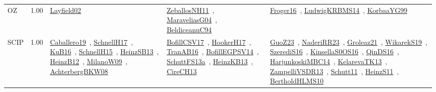 {\begin{longtable}{p{3cm}r>{\raggedright\arraybackslash}p{6cm}>{\raggedright\arraybackslash}p{6cm}>{\raggedright\arraybackslash}p{8cm}}
\index{OZ}\index{CPSystems!OZ}OZ &  1.00 & \href{../works/Layfield02.pdf}{Layfield02}~\cite{Layfield02} & \href{../works/ZeballosNH11.pdf}{ZeballosNH11}~\cite{ZeballosNH11}, \href{../works/MaraveliasG04.pdf}{MaraveliasG04}~\cite{MaraveliasG04}, \href{../works/BeldiceanuC94.pdf}{BeldiceanuC94}~\cite{BeldiceanuC94} & \href{../works/Froger16.pdf}{Froger16}~\cite{Froger16}, \href{../works/LudwigKRBMS14.pdf}{LudwigKRBMS14}~\cite{LudwigKRBMS14}, \href{../works/KorbaaYG99.pdf}{KorbaaYG99}~\cite{KorbaaYG99}\\
\index{SCIP}\index{CPSystems!SCIP}SCIP &  1.00 & \href{../works/Caballero19.pdf}{Caballero19}~\cite{Caballero19}, \href{../works/SchnellH17.pdf}{SchnellH17}~\cite{SchnellH17}, \href{../works/KuB16.pdf}{KuB16}~\cite{KuB16}, \href{../works/SchnellH15.pdf}{SchnellH15}~\cite{SchnellH15}, \href{../works/HeinzSB13.pdf}{HeinzSB13}~\cite{HeinzSB13}, \href{../works/HeinzB12.pdf}{HeinzB12}~\cite{HeinzB12}, \href{../works/MilanoW09.pdf}{MilanoW09}~\cite{MilanoW09}, \href{../works/AchterbergBKW08.pdf}{AchterbergBKW08}~\cite{AchterbergBKW08} & \href{../works/BofillCSV17.pdf}{BofillCSV17}~\cite{BofillCSV17}, \href{../works/HookerH17.pdf}{HookerH17}~\cite{HookerH17}, \href{../works/TranAB16.pdf}{TranAB16}~\cite{TranAB16}, \href{../works/BofillEGPSV14.pdf}{BofillEGPSV14}~\cite{BofillEGPSV14}, \href{../works/SchuttFS13a.pdf}{SchuttFS13a}~\cite{SchuttFS13a}, \href{../works/HeinzKB13.pdf}{HeinzKB13}~\cite{HeinzKB13}, \href{../works/CireCH13.pdf}{CireCH13}~\cite{CireCH13} & \href{../works/GuoZ23.pdf}{GuoZ23}~\cite{GuoZ23}, \href{../works/NaderiRR23.pdf}{NaderiRR23}~\cite{NaderiRR23}, \href{../works/Groleaz21.pdf}{Groleaz21}~\cite{Groleaz21}, \href{../works/WikarekS19.pdf}{WikarekS19}~\cite{WikarekS19}, \href{../works/SzerediS16.pdf}{SzerediS16}~\cite{SzerediS16}, \href{../works/KinsellaS0OS16.pdf}{KinsellaS0OS16}~\cite{KinsellaS0OS16}, \href{../works/QinDS16.pdf}{QinDS16}~\cite{QinDS16}, \href{../works/HarjunkoskiMBC14.pdf}{HarjunkoskiMBC14}~\cite{HarjunkoskiMBC14}, \href{../works/KelarevaTK13.pdf}{KelarevaTK13}~\cite{KelarevaTK13}, \href{../works/ZampelliVSDR13.pdf}{ZampelliVSDR13}~\cite{ZampelliVSDR13}, \href{../works/Schutt11.pdf}{Schutt11}~\cite{Schutt11}, \href{../works/HeinzS11.pdf}{HeinzS11}~\cite{HeinzS11}, \href{../works/BertholdHLMS10.pdf}{BertholdHLMS10}~\cite{BertholdHLMS10}\\

\end{longtable}}
